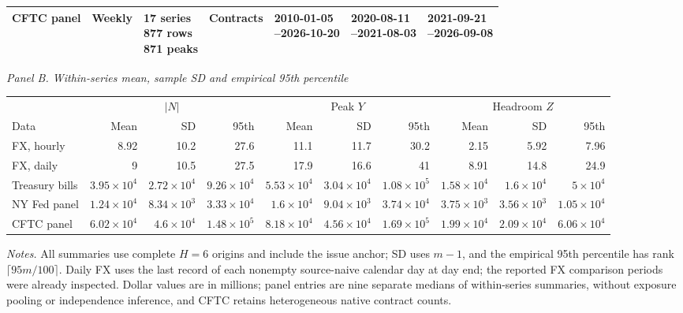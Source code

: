 \begin{table}[!htbp]
\begin{tabular}{@{}p{.13\linewidth}p{.09\linewidth}p{.11\linewidth}p{.08\linewidth}p{.15\linewidth}p{.16\linewidth}p{.16\linewidth}@{}}
CFTC panel & Weekly & \shortstack[l]{17 series\\877 rows\\871 peaks} & Contracts & \shortstack[l]{2010-01-05\\--2026-10-20} & \shortstack[l]{2020-08-11\\--2021-08-03} & \shortstack[l]{2021-09-21\\--2026-09-08} \\
\bottomrule
\end{tabular}
\par\vspace{7pt}
\textit{Panel B. Within-series mean, sample SD and empirical 95th percentile}\\[3pt]
\begin{tabular}{@{}l*{9}{r}@{}}
\toprule
 & \multicolumn{3}{c}{$|N|$} & \multicolumn{3}{c}{Peak $Y$} & \multicolumn{3}{c}{Headroom $Z$} \\
\cmidrule(lr){2-4}\cmidrule(lr){5-7}\cmidrule(lr){8-10}
Data & Mean & SD & 95th & Mean & SD & 95th & Mean & SD & 95th \\
\midrule
FX, hourly & 8.92 & 10.2 & 27.6 & 11.1 & 11.7 & 30.2 & 2.15 & 5.92 & 7.96 \\
FX, daily & 9 & 10.5 & 27.5 & 17.9 & 16.6 & 41 & 8.91 & 14.8 & 24.9 \\
Treasury bills & $3.95\!\times\!10^{4}$ & $2.72\!\times\!10^{4}$ & $9.26\!\times\!10^{4}$ & $5.53\!\times\!10^{4}$ & $3.04\!\times\!10^{4}$ & $1.08\!\times\!10^{5}$ & $1.58\!\times\!10^{4}$ & $1.6\!\times\!10^{4}$ & $5\!\times\!10^{4}$ \\
NY Fed panel & $1.24\!\times\!10^{4}$ & $8.34\!\times\!10^{3}$ & $3.33\!\times\!10^{4}$ & $1.6\!\times\!10^{4}$ & $9.04\!\times\!10^{3}$ & $3.74\!\times\!10^{4}$ & $3.75\!\times\!10^{3}$ & $3.56\!\times\!10^{3}$ & $1.05\!\times\!10^{4}$ \\
CFTC panel & $6.02\!\times\!10^{4}$ & $4.6\!\times\!10^{4}$ & $1.48\!\times\!10^{5}$ & $8.18\!\times\!10^{4}$ & $4.56\!\times\!10^{4}$ & $1.69\!\times\!10^{5}$ & $1.99\!\times\!10^{4}$ & $2.09\!\times\!10^{4}$ & $6.06\!\times\!10^{4}$ \\
\bottomrule
\end{tabular}
\endgroup
\begin{minipage}{.98\linewidth}\footnotesize\emph{Notes.} All summaries use complete $H=6$ origins and include the issue anchor; SD uses $m-1$, and the empirical 95th percentile has rank $\lceil95m/100\rceil$. Daily FX uses the last record of each nonempty source-naive calendar day at day end; the reported FX comparison periods were already inspected. Dollar values are in millions; panel entries are nine separate medians of within-series summaries, without exposure pooling or independence inference, and CFTC retains heterogeneous native contract counts.\end{minipage}
\end{table}
